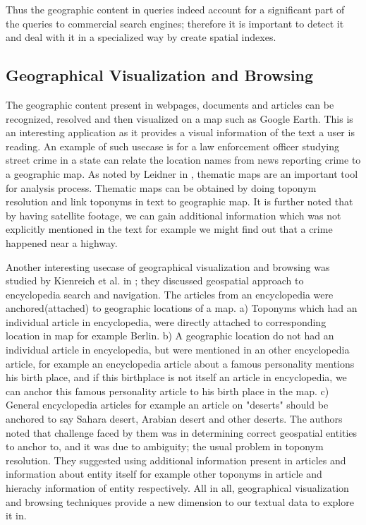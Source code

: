 \documentclass[
     11pt,         %
     a4paper,      %
     oneside,
     ]{article}
\begin{document}
Thus the geographic content in queries indeed account for a significant part of the queries to commercial search engines; therefore it is important to detect it and deal with it in a specialized way by create spatial indexes.


\subsection{Geographical Visualization and Browsing} The geographic content present in webpages, documents and articles can be recognized, resolved and then visualized on a map such as Google Earth. This is an interesting application as it provides a visual information of the text a user is reading. An example of such usecase is for a law enforcement officer studying street crime in a state can relate the location names from news reporting crime to a geographic map. As noted by Leidner in \cite{Leidner:2008:PhD}, thematic maps are an important tool for analysis process. Thematic maps can be obtained by doing toponym resolution and link toponyms in text to geographic map. It is further noted that by having satellite footage, we can gain additional information which was not explicitly mentioned in the text for example we might find out that a crime happened near a highway.
 
Another interesting usecase of geographical visualization and browsing was studied by Kienreich et al. in \cite{Kienreich:2006:GAE:1153927.1154675}; they discussed geospatial approach to encyclopedia search and navigation. The articles from an encyclopedia were anchored(attached) to geographic locations of a map. a) Toponyms which had an individual article in encyclopedia, were directly attached to corresponding location in map for example Berlin. b) A geographic location do not had an individual article in encyclopedia, but were mentioned in an other encyclopedia article, for example an encyclopedia article about a famous personality mentions his birth place, and if this birthplace is not itself an article in encyclopedia, we can anchor this famous personality article to his birth place in the map. c) General encyclopedia articles for example an article on "deserts" should be anchored to say Sahara desert, Arabian desert and other deserts. The authors noted that challenge faced by them was in determining correct geospatial entities to anchor to, and it was due to ambiguity; the usual problem in toponym resolution. They suggested using additional information present in articles and information about entity itself for example other toponyms in article and hierachy information of entity respectively. All in all, geographical visualization and browsing techniques provide a new dimension to our textual data to explore it in.
\end{document}
